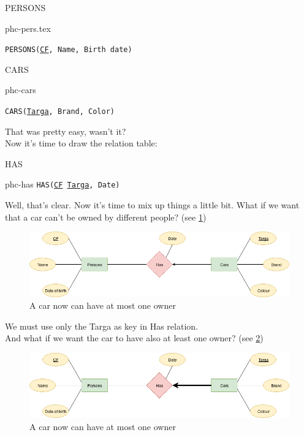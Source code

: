 \documentclass[class=book, crop=false, oneside]{standalone}
\begin{document}
\begin{minipage}{0.45\textwidth}
	PERSONS
	\begin{table}[H]
		\centering
		{phc-pers.tex}
	\end{table}
	\texttt{PERSONS(\underline{CF}, Name, Birth date)}
\end{minipage}
\hspace{.1\textwidth}
\begin{minipage}{.45\textwidth}
	CARS
	\begin{table}[H]
		\centering
		{phc-cars}
	\end{table}
	\texttt{CARS(\underline{Targa}, Brand, Color)}
\end{minipage}
\vskip 20pt
That was pretty easy, wasn't it?\\
Now it's time to draw the relation table:
\vskip 20pt
\begin{minipage}{.7\textwidth}
	HAS
	\begin{table}[H]
		{phc-has}
		\texttt{HAS(\underline{CF} \underline{Targa}, Date)}
	\end{table}
\end{minipage}
\vskip 20pt
Well, that's clear. Now it's time to mix up things a little bit.
What if we want that a car can't be owned by different people? (see \ref{diagram1.01})
\begin{figure}[H]
	\centering
	\includegraphics[width=.9\textwidth,keepaspectratio]{diagram1_01.png}
	\caption{A car now can have at most one owner}
	\label{diagram1.01}
\end{figure}
We must use only the Targa as key in Has relation.
\\
And what if we want the car to have also at least one owner? (see \ref{diagram1_02})
\begin{figure}[H]
	\centering
	\includegraphics[width=.9\textwidth,keepaspectratio]{diagram1_02.png}
	\caption{A car now can have at most one owner}
	\label{diagram1_02}
\end{figure}
\end{document}
